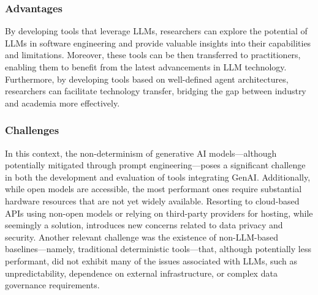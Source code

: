 
\subsubsection{Advantages}

By developing tools that leverage LLMs, researchers can explore the potential of LLMs in software engineering and provide valuable insights into their capabilities and limitations.
Moreover, these tools can be then transferred to practitioners, enabling them to benefit from the latest advancements in LLM technology.
Furthermore, by developing tools based on well-defined agent architectures, researchers can facilitate technology transfer, bridging the gap between industry and academia more effectively. 

\subsubsection{Challenges}

In this context, the non-determinism of generative AI models—although potentially mitigated through prompt engineering—poses a significant challenge in both the development and evaluation of tools integrating GenAI. 
Additionally, while open models are accessible, the most performant ones require substantial hardware resources that are not yet widely available. Resorting to cloud-based APIs using non-open models or relying on third-party providers for hosting, while seemingly a solution, introduces new concerns related to data privacy and security.
Another relevant challenge was the existence of non-LLM-based baselines—namely, traditional deterministic tools—that, although potentially less performant, did not exhibit many of the issues associated with LLMs, such as unpredictability, dependence on external infrastructure, or complex data governance requirements.

